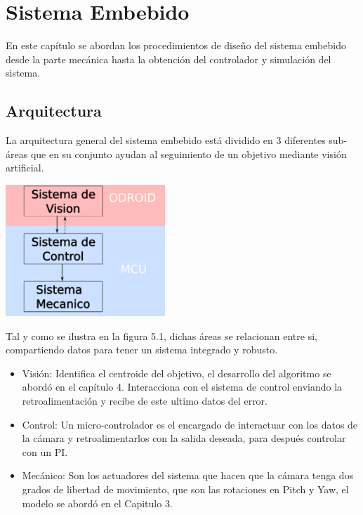 \chapter{Sistema Embebido}

En este capítulo se abordan los procedimientos de diseño del sistema embebido desde la parte mecánica hasta la
obtención del controlador y simulación del sistema.

\section{Arquitectura}
La arquitectura general del sistema embebido está dividido en 3 diferentes sub-áreas que en su conjunto ayudan al
seguimiento de un objetivo mediante visión artificial.
\begin{center}
	\includegraphics[width=0.45\textwidth]{Contenido/Cuerpo/Capitulo5/Fig12.eps}
	\label{Fig1}
\end{center}
Tal y como se ilustra en la figura 5.1, dichas áreas se relacionan entre si, compartiendo datos para tener un
sistema integrado y robusto.
\begin{itemize}
	\item Visión: Identifica el centroide del objetivo, el desarrollo del algoritmo se abordó en el capítulo 4. Interacciona con el sistema de control enviando la retroalimentación
	      y recibe de este ultimo datos del error.
	\item Control: Un micro-controlador es el encargado de interactuar con los datos de la cámara y retroalimentarlos con la
	      salida deseada, para después controlar con un PI.
	\item Mecánico: Son los actuadores del sistema que hacen que la cámara tenga dos grados de libertad de movimiento, que
	      son las rotaciones en Pitch y Yaw, el modelo se abordó en el Capitulo 3.
\end{itemize}
